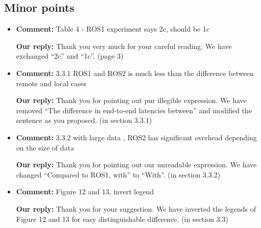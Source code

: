 \documentclass{article}
\begin{document}
\subsection{Minor points}
\begin{itemize}

\item \begin{flushleft}
    \textbf{Comment:} Table 4 - ROS1 experiment says 2c, should be 1c
  \end{flushleft}

  \begin{flushleft}
    \textbf{Our reply:} Thank you very much for your careful reading. We have exchanged ``2c'' and ``1c''. (page 3)
  \end{flushleft}


\item \begin{flushleft}
    \textbf{Comment:} 3.3.1 ROS1 and ROS2 is much less than the difference between remote and local cases
  \end{flushleft}

  \begin{flushleft}
    \textbf{Our reply:} Thank you for pointing out pur illegible expression. We have removed ``The difference in end-to-end latencies between'' and modified the sentence as you proposed. (in section 3.3.1)
  \end{flushleft}


\item \begin{flushleft}
    \textbf{Comment:} 3.3.2 with large data , ROS2 has significant overhead depending on the size of data
  \end{flushleft}

  \begin{flushleft}
    \textbf{Our reply:} Thank you for pointing out our unreadable expression. We have changed ``Compared to ROS1, with'' to ``With''. (in section 3.3.2)
  \end{flushleft}


\item \begin{flushleft}
    \textbf{Comment:} Figure 12 and 13, invert legend
  \end{flushleft}

  \begin{flushleft}
    \textbf{Our reply:} Thank you for your suggestion. We have inverted the legends of Figure 12 and 13 for easy distinguishable difference. (in section 3.3)
  \end{flushleft}



\end{itemize}
\end{document}

